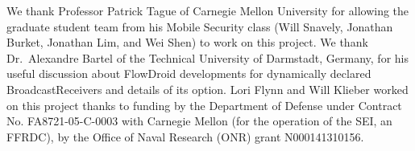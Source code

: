 \begin{acknowledgments}
We thank Professor Patrick Tague of Carnegie Mellon University for allowing the graduate student team from his Mobile Security class (Will Snavely, Jonathan Burket, Jonathan Lim, and Wei Shen) to work on this project. We thank Dr.\ Alexandre Bartel of the Technical University of Darmstadt, Germany, for his useful discussion about FlowDroid developments for dynamically declared BroadcastReceivers and details of its  option. Lori Flynn and Will Klieber worked on this project thanks to funding by the Department of Defense under Contract No. FA8721-05-C-0003 with Carnegie Mellon (for the operation of the SEI, an FFRDC), by the Office of Naval Research (ONR) grant N000141310156.
\end{acknowledgments}
